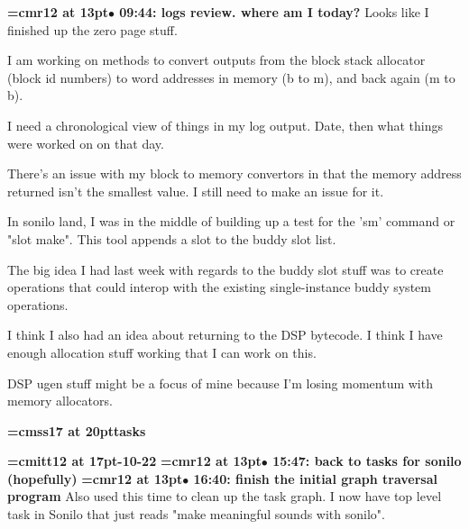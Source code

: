 {\smallskip\noindent\bf\font\titlefont=cmr12 at 13pt\titlefont $\bullet$ 09:44: logs review. where am I today?}\smallskip
Looks like I finished up the zero page stuff.
\par

I am working on methods to convert outputs from the block stack allocator (block id numbers) to word addresses in memory (b to m), and back again (m to b).
\par

I need a chronological view of things in my log output. Date, then what things were worked on on that day.
\par

There's an issue with my block to memory convertors in that the memory address returned isn't the smallest value. I still need to make an issue for it.
\par

In sonilo land, I was in the middle of building up a test for the 'sm' command or "slot make". This tool appends a slot to the buddy slot list.
\par

The big idea I had last week with regards to the buddy slot stuff was to create operations that could interop with the existing single-instance buddy system operations.
\par

I think I also had an idea about returning to the DSP bytecode. I think I have enough allocation stuff working that I can work on this.
\par

DSP ugen stuff might be a focus of mine because I'm losing momentum with memory allocators.
\par

{\medskip\noindent\bf\font\titlefont=cmss17 at 20pt\titlefont tasks}\medskip

{\medskip\noindent\bf\font\titlefont=cmitt12 at 17pt-10-22}\medskip
{\smallskip\noindent\bf\font\titlefont=cmr12 at 13pt\titlefont $\bullet$ 15:47: back to tasks for sonilo (hopefully)}\smallskip
{\smallskip\noindent\bf\font\titlefont=cmr12 at 13pt\titlefont $\bullet$ 16:40: finish the initial graph traversal program}\smallskip
Also used this time to clean up the task graph. I now have top level task in Sonilo that just reads "make meaningful sounds with sonilo".
\par

